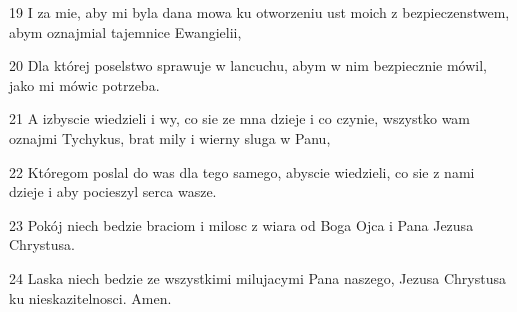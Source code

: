 \par 19 I za mie, aby mi byla dana mowa ku otworzeniu ust moich z bezpieczenstwem, abym oznajmial tajemnice Ewangielii,
\par 20 Dla której poselstwo sprawuje w lancuchu, abym w nim bezpiecznie mówil, jako mi mówic potrzeba.
\par 21 A izbyscie wiedzieli i wy, co sie ze mna dzieje i co czynie, wszystko wam oznajmi Tychykus, brat mily i wierny sluga w Panu,
\par 22 Któregom poslal do was dla tego samego, abyscie wiedzieli, co sie z nami dzieje i aby pocieszyl serca wasze.
\par 23 Pokój niech bedzie braciom i milosc z wiara od Boga Ojca i Pana Jezusa Chrystusa.
\par 24 Laska niech bedzie ze wszystkimi milujacymi Pana naszego, Jezusa Chrystusa ku nieskazitelnosci. Amen.


